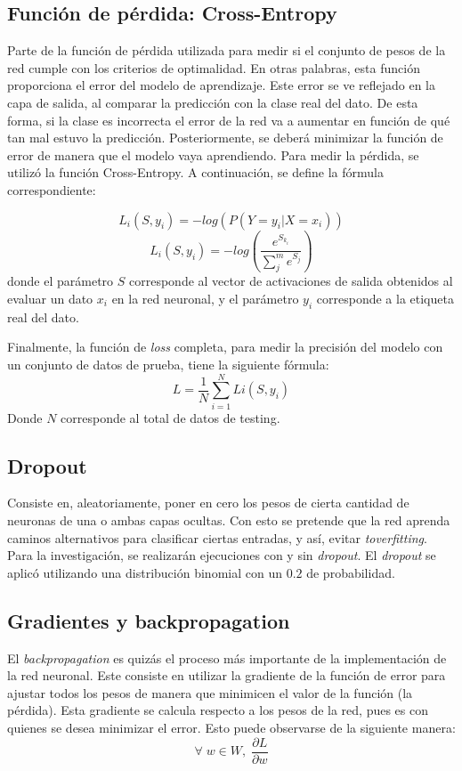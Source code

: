 \documentclass[journal]{IEEEtran}
\begin{document}
\subsection{Función de pérdida: Cross-Entropy}

Parte de la función de pérdida utilizada para medir si el conjunto de pesos de la red cumple con los criterios de optimalidad. En otras palabras, esta función
proporciona el error del modelo de aprendizaje. Este error se ve reflejado en la capa de salida, al comparar la predicción con la clase real del dato. De esta forma, si la clase es incorrecta el error de la red va a aumentar en función de qué tan mal estuvo la predicción. Posteriormente, se deberá minimizar la función de error de manera que el modelo vaya aprendiendo. Para medir la pérdida, se utilizó la función Cross-Entropy. A continuación, se define la fórmula correspondiente:

\begin{equation}\label{eq:crossent}
L_i(S, y_i) = -log(P(Y=y_i|X=x_i))
\end{equation}
\[L_i(S, y_i) = -log(\frac{e^{S_{k_i}}}{\sum_{j}^{m} e^{S_j}})\]
donde el parámetro \(S\) corresponde al vector de activaciones de salida obtenidos al evaluar un dato \(x_i\) en la red neuronal, y el parámetro \(y_i\) corresponde a la etiqueta real del dato. 

Finalmente, la función de \textit{loss} completa, para medir la precisión del modelo con un conjunto de datos de prueba, tiene la siguiente fórmula:
\begin{equation}\label{loss}
L = \frac{1}{N} \sum_{i=1}^{N} Li( S, y_i)
\end{equation}
Donde \(N\) corresponde al total de datos de testing. 

\subsection{Dropout}
Consiste en, aleatoriamente, poner en cero los pesos de cierta cantidad de neuronas de una o ambas capas ocultas. Con esto se pretende que la red aprenda caminos alternativos para clasificar ciertas entradas, y así, evitar \textit{toverfitting}. Para la investigación, se realizarán ejecuciones con y sin \textit{dropout}. El \textit{dropout} se aplicó utilizando una distribución binomial con un $0.2$ de probabilidad.

\subsection{Gradientes y backpropagation}
El \textit{backpropagation} es quizás el proceso más importante de la implementación de la red neuronal. Este consiste en utilizar la gradiente de la función de error para ajustar todos los pesos de manera que minimicen el valor de la función (la pérdida). Esta gradiente se calcula respecto a los pesos de la red, pues es con quienes se desea minimizar el error. Esto puede observarse de la siguiente manera:
\begin{equation}\label{eq:grad}
    \forall \; w \in W, \;  \frac{\partial L}{\partial w}
\end{equation}
\end{document}

